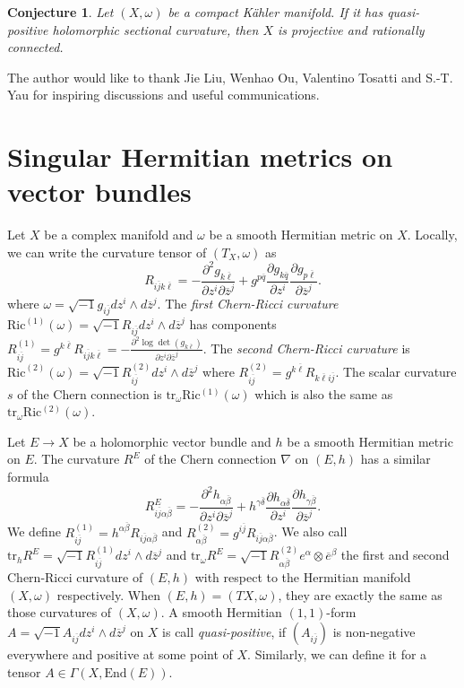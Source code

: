 \documentclass[11pt]{amsart}
\theoremstyle{plain}
\newtheorem{conjecture}[thm]{Conjecture}
\theoremstyle{definition}
\newcommand{\sq}{\sqrt{-1}}
\newcommand{\p}{\partial}
\renewcommand{\bar}{\overline}
\newcommand{\ts}{\otimes}
\renewcommand{\>}{\rightarrow}
\numberwithin{equation}{section} %
\begin{document}
	\begin{conjecture}\label{quasipositiveHSC} Let $(X,\omega)$ be a compact K\"ahler manifold. If it has quasi-positive holomorphic sectional curvature, then $X$ is projective and rationally connected.
	\end{conjecture}
	
	
	

	
	
	  The author would like to thank Jie Liu, Wenhao Ou, Valentino Tosatti and S.-T. Yau for inspiring discussions and useful communications. 
	
	
	
	\baselineskip
	


	\section{Singular Hermitian metrics on vector bundles}
	
	Let $X$ be a complex manifold and $\omega$ be a smooth Hermitian metric on $X$. Locally, we can write the curvature tensor of $(T_X, \omega)$ as 
	$$R_{i\bar j k\bar \ell}=-\frac{\p^2 g_{k\bar\ell}}{\p z^i\p\bar z^j}+g^{p\bar q}\frac{\p g_{k\bar q}}{\p z^i}\frac{\p g_{p\bar \ell}}{\p\bar z^j}.$$ where $\omega=\sq g_{i\bar j}dz^i\wedge d\bar z^j$.
	The \emph{first Chern-Ricci curvature} $\mathrm{Ric}^{(1)}(\omega)=\sq R_{i\bar j}dz^i\wedge d\bar z^j$  has components
	$R^{(1)}_{i\bar j}=g^{k\bar\ell}R_{i\bar j k\bar \ell}=-\frac{\p^2\log \det (g_{k\bar\ell})}{\p z^i\p\bar z^j}.$
	The \emph{second Chern-Ricci curvature} is  $\mathrm{Ric}^{(2)}(\omega)=\sq R^{(2)}_{i\bar j}dz^i\wedge d\bar z^j$ where
	$R^{(2)}_{i\bar j}=g^{k\bar\ell}R_{ k\bar \ell i\bar j}$. The scalar curvature $s$ of the Chern connection is $\mathrm{tr}_\omega \mathrm{Ric^{(1)}}(\omega)$ which is also the same as $\mathrm{tr}_\omega \mathrm{Ric^{(2)}}(\omega)$. 
	
		Let $E\>X$ be a holomorphic vector bundle and $h$ be a smooth Hermitian metric on $E$. The curvature $R^E$ of the Chern connection $\nabla $ on $(E,h)$ has a similar formula $$R^E_{i\bar j \alpha\bar\beta}=-\frac{\p^2 h_{\alpha\bar\beta}}{\p z^i\p\bar z^j}+h^{\gamma\bar\delta}\frac{\p h_{\alpha\bar \delta}}{\p z^i}\frac{\p h_{\gamma\bar\beta}}{\p \bar z^j}.$$
	We define 
	$R^{(1)}_{i\bar j}=h^{\alpha\bar\beta} R_{i\bar j \alpha\bar\beta}$ and $R^{(2)}_{\alpha\bar\beta}=g^{i\bar j}R_{i\bar j \alpha\bar\beta}$.
	We also call $\mathrm{tr}_hR^E=\sq R_{i\bar j}^{(1)}dz^i\wedge d\bar z^j$ and $\mathrm{tr}_\omega R^E= \sq R_{\alpha\bar \beta}^{(2)}e^\alpha \ts \bar e^\beta$ the first and second Chern-Ricci curvature of $(E,h)$ with respect to the Hermitian manifold $(X,\omega)$ respectively. When $(E,h)=(TX,\omega)$, they are exactly the same as those curvatures of $(X,\omega)$.   A smooth Hermitian $(1,1)$-form $A=\sq A_{i\bar j}dz^i\wedge d\bar z^j$ on $X$ is call \emph{quasi-positive}, if $(A_{i\bar j})$ is non-negative everywhere and positive at some point of $X$. Similarly, we can define it for a  tensor $A \in \Gamma(X,\mathrm{End}(E))$.\\
	
\end{document}

